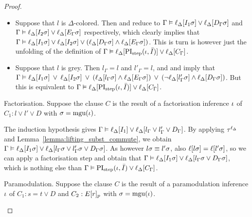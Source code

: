 \begin{proof}
\begin{description}
\begin{itemize}
				\item Suppose that $l$ is $\Delta$-colored.
					Then \markA{} and \markB{} reduce to 
					$\Gamma \vDash \ell_{\Delta}[I_1\sigma] \lor \ell_{\Delta}[D_\Gamma\sigma]$
					and
					$\Gamma \vDash \ell_{\Delta}[I_2\sigma] \lor \ell_{\Delta}[E_\Gamma\sigma]$
					respectively,
					which clearly implies that 
					$\Gamma \vDash \ell_{\Delta}[I_1\sigma] \lor \ell_{\Delta}[I_2\sigma] \lor (\ell_{\Delta}[D_\Gamma\sigma] \land \ell_{\Delta}[E_\Gamma\sigma])$.
					This is turn is however just the unfolding of the definition of
					$\Gamma \vDash \ell_{\Delta}[\operatorname{PI}_{\mathrm{step}}(\iota, \bar I)] \lor \ell_{\Delta}[C_\Gamma]$.

				\item Suppose that $l$ is grey.
					Then $l_\Gamma = l$ and $l'_\Gamma = l$, and 
					\markA{} and \markB{} imply that
					$\Gamma \vDash
					\ell_{\Delta}[I_1\sigma] \;\,{\lor}\;\,
					\ell_{\Delta}[I_2\sigma] \;\,{\lor}\;\,\allowbreak
					(\ell_{\Delta}[l_\Gamma\sigma] \land \ell_{\Delta}[E_\Gamma\sigma]) \;\,{\lor}\;\,\allowbreak
					(\lnot\ell_{\Delta}[l'_\Gamma\sigma] \land \ell_{\Delta}[D_\Gamma\sigma])$.
					But this is equivalent to
					$\Gamma \vDash \ell_{\Delta}[\operatorname{PI}_{\mathrm{step}}(\iota, \bar I)] \lor \ell_{\Delta}[C_\Gamma]$.

			\end{itemize}


		\item{} Factorisation. 
			Suppose the clause $C$ is the result of a factorisation inference $\iota$ of $C_1: l \lor l' \lor D$ with $\sigma=\operatorname{mgu}(\iota)$.

			The induction hypothesis gives $\Gamma \vDash \ell_{\Delta}[ I_1 ] \lor \ell_{\Delta}[ l_\Gamma \lor l'_\Gamma \lor D_\Gamma ]$.
			By applying $\tau^{\ell_\Delta}$
			and Lemma~\ref{lemma:lifting_subst_commute}, we obtain
			$\Gamma \vDash \ell_{\Delta}[ I_1\sigma ] \lor \ell_{\Delta}[ l_\Gamma\sigma \lor l'_\Gamma\sigma \lor D_\Gamma\sigma ]$.
			As however $l\sigma \equiv l'\sigma$, 
			also $\ell[l\sigma] = \ell[l'\sigma]$, so we can apply a factorisation step and obtain that
			$\Gamma \vDash \ell_{\Delta}[ I_1\sigma ] \lor \ell_{\Delta}[ l_\Gamma\sigma \lor D_\Gamma\sigma ]$,
			which is nothing else than $\Gamma \vDash \operatorname{PI}_{\mathrm{step}}(\iota, \bar I) \lor \ell_{\Delta}[C_\Gamma]$.

		\item{} Paramodulation.
			Suppose the clause $C$ is the result of a paramodulation inference\nolinebreak{} $\iota$ of $C_1: s=t \lor D$ and $C_2: E{[r]_{p}}$ with $\sigma=\operatorname{mgu}(\iota)$.


\end{description}
\end{proof}
